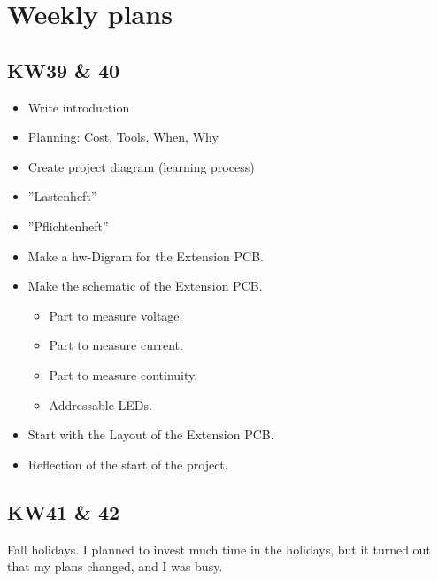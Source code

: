\section{Weekly plans}
\label{sec:Project Planning}

\subsection{KW39 \& 40}
\begin{itemize}
    \item Write introduction
    \item Planning: Cost, Tools, When, Why
    \item Create project diagram (learning process)
    \item ''Lastenheft''
    \item ''Pflichtenheft''
    \item Make a \acs{hw}-Digram for the Extension PCB.
    \item Make the schematic of the Extension PCB. 
    \begin{itemize}
        \item Part to measure voltage.
        \item Part to measure current.
        \item Part to measure continuity.
        \item Addressable LEDs.
    \end{itemize}
    \item Start with the Layout of the Extension PCB.
    \item Reflection of the start of the project.
\end{itemize}




\subsection{KW41 \& 42}
Fall holidays. I planned to invest much time in the holidays, but it turned out that my plans changed, and I was busy.



